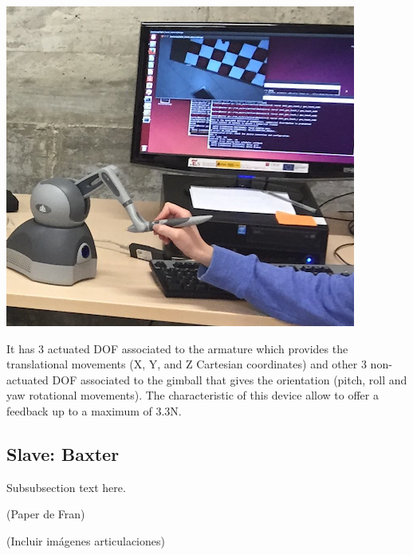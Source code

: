\documentclass[journal,twoside]{JoPhA}
\begin{document}
\includegraphics[scale=0.5]{Images/BaxterYHapticSmall.jpg} 

It has 3 actuated DOF associated to the armature which provides the translational movements (X, Y, and Z Cartesian coordinates) and other 3 non-actuated DOF associated to the gimball  that gives the orientation (pitch, roll and yaw rotational movements).  The characteristic of this device allow to offer a feedback up to a maximum of 3.3N.


\subsection{Slave: Baxter}
Subsubsection text here. 

(Paper de Fran)

(Incluir imágenes articulaciones)
\end{document}
